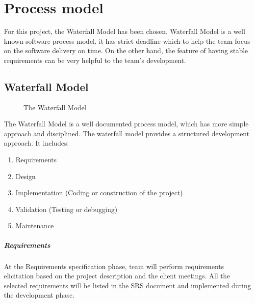 \documentclass[11pt, a4paper]{report}
\begin{document}
\pagebreak
\chapter{Process model}
For this project, the Waterfall Model has been chosen. Waterfall Model is a well known software process model, it has strict deadline which to help the team focus on the software delivery on time. On the other hand, the feature of having stable requirements can be very helpful to the team's development. 

\section{Waterfall Model}

\begin{figure}[ht]
\centering
\setlength\fboxsep{2pt}
\setlength\fboxrule{0.2pt}
\caption{The Waterfall Model}
\label{sec:WTF}
\label{fig:WTF}
\end{figure}

The Waterfall Model is a well documented process model, which has more simple approach and disciplined. The waterfall model provides a structured development approach. It includes:
\begin{enumerate}
	\item  Requirements
	\item  Design
	\item  Implementation (Coding or construction of the project)
	\item  Validation (Testing or debugging)
	\item  Maintenance
\end{enumerate}

\paragraph{Requirements}
At the Requirements specification phase, team will perform requirements elicitation based on the project description and the client meetings. All the selected requirements will be listed in the SRS document and implemented during the development phase.
\end{document}

